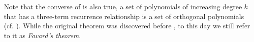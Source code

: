 Note that the converse of  is also true, a set of polynomials of increasing degree $k$ that has a three-term recurrence relationship is a set of orthogonal polynomials (cf. ).
While the original theorem was discovered before \cite{1935-favard}, to this day we still refer to it as \textit{Favard's theorem}.

